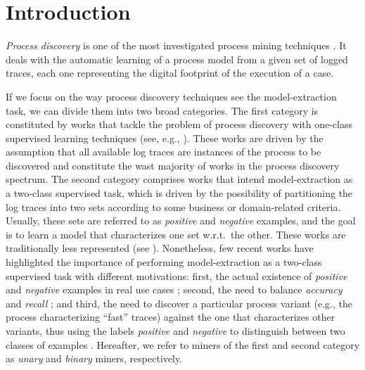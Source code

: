 

\section{Introduction}
\label{sec:introduction}

\emph{Process discovery} is one of the most investigated process mining techniques \cite{2012-Aalst}. It deals with the automatic learning of a process model from a given set of logged traces, each one representing the digital footprint of the execution of a case.

If we focus on the way process discovery techniques see the model-extraction task, we can divide them into two broad categories. %
The first category is constituted by works that tackle the problem of process discovery with one-class supervised learning techniques (see, e.g., \cite{2010-Aalst,2004-Aalst,2007-Gunther,2003-Weijters,DBLP:conf/bpm/AalstMFG17}). These works are driven by the assumption that all available log traces are instances of the process to be discovered and constitute the wast majority of works in the process discovery spectrum. 
The second category comprises works that intend model-extraction as a two-class supervised task, which is driven by the possibility of partitioning the log traces into two sets according to some business or domain-related criteria. Usually, these sets are referred to as \emph{positive} and \emph{negative} examples, and the goal is to learn a model that characterizes one set w.r.t.\ the other. These works are traditionally less represented (see \cite{2009-Chesani,2009-Goedertier,2006-Maruster}). Nonetheless, few recent works \cite{deviant-tkde,2018-Ponce,DBLP:conf/bpm/SlaatsDB21} have highlighted the importance of performing model-extraction as a two-class supervised task with different motivations: first, the actual existence of \emph{positive} and \emph{negative} examples in real use cases \cite{2018-Ponce,DBLP:conf/bpm/SlaatsDB21}; second, the need to balance \emph{accuracy} and \emph{recall} \cite{DBLP:conf/bpm/SlaatsDB21}; and third, the need to discover a particular process variant (e.g., the process characterizing ``fast'' traces) against the one that characterizes other variants, thus using the labels \emph{positive} and \emph{negative} to distinguish between two classes of examples \cite{deviant-tkde}.  
Hereafter, we refer to miners of the first and second category as \emph{unary} and \emph{binary} miners, respectively. 

